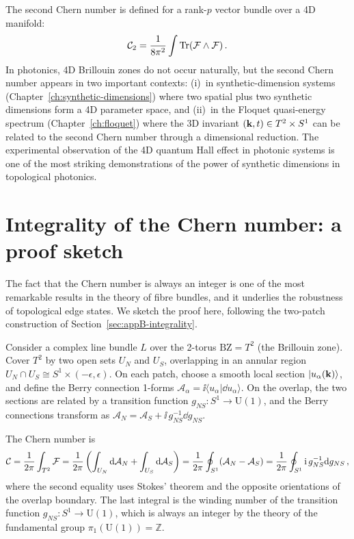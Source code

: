 The second Chern number is defined for a rank-$p$ vector bundle over a
4D manifold:
\begin{equation}\label{eq:appB-second-chern-formula}
  \mathcal{C}_2 = \frac{1}{8\pi^2}\int\operatorname{Tr}(\mathcal{F}\wedge\mathcal{F})\,.
\end{equation}
In photonics, 4D Brillouin zones do not occur naturally, but
the second Chern number appears in two important contexts: (i)~in
synthetic-dimension systems (Chapter~\ref{ch:synthetic-dimensions})
where two spatial plus two synthetic dimensions form a 4D parameter
space, and (ii)~in the Floquet quasi-energy spectrum
(Chapter~\ref{ch:floquet}) where the 3D invariant
$(\mathbf{k},t)\in T^2\times S^1$ can be related to the second Chern
number through a dimensional reduction.  The experimental observation
of the 4D quantum Hall effect in photonic systems
\cite{ozawa2018topological,price2022roadmap} is one of the most
striking demonstrations of the power of synthetic dimensions in
topological photonics.


\section{Integrality of the Chern number: a proof sketch}
\label{sec:appB-integrality-proof}

The fact that the Chern number is always an integer is one of the
most remarkable results in the theory of fibre bundles, and it
underlies the robustness of topological edge states.  We sketch the
proof here, following the two-patch construction of
Section~\ref{sec:appB-integrality}.

Consider a complex line bundle $L$ over the 2-torus $\mathrm{BZ}=T^2$
(the Brillouin zone).  Cover $T^2$ by two open sets $U_N$ and $U_S$,
overlapping in an annular region $U_N\cap U_S\cong S^1\times(-\epsilon,
\epsilon)$.  On each patch, choose a smooth local section
$|u_\alpha(\mathbf{k})\rangle$, and define the Berry connection 1-forms
$\mathcal{A}_\alpha=\ii\langle u_\alpha|\dd u_\alpha\rangle$.  On the
overlap, the two sections are related by a transition function
$g_{NS}:S^1\to\mathrm{U}(1)$, and the Berry connections transform as
$\mathcal{A}_N=\mathcal{A}_S+\ii\,g_{NS}^{-1}\dd g_{NS}$.

The Chern number is
\begin{equation}\label{eq:appB-chern-integral}
  \mathcal{C} = \frac{1}{2\pi}\int_{T^2}\mathcal{F}
  = \frac{1}{2\pi}\left(\int_{U_N}\mathrm{d}\mathcal{A}_N
  + \int_{U_S}\mathrm{d}\mathcal{A}_S\right)
  = \frac{1}{2\pi}\oint_{S^1}(\mathcal{A}_N-\mathcal{A}_S)
  = \frac{1}{2\pi}\oint_{S^1}\mathrm{i}\,g_{NS}^{-1}\mathrm{d} g_{NS}\,,
\end{equation}
where the second equality uses Stokes' theorem and the opposite
orientations of the overlap boundary.  The last integral is the
winding number of the transition function $g_{NS}:S^1\to\mathrm{U}(1)$,
which is always an integer by the theory of the fundamental group
$\pi_1(\mathrm{U}(1))=\mathbb{Z}$.


